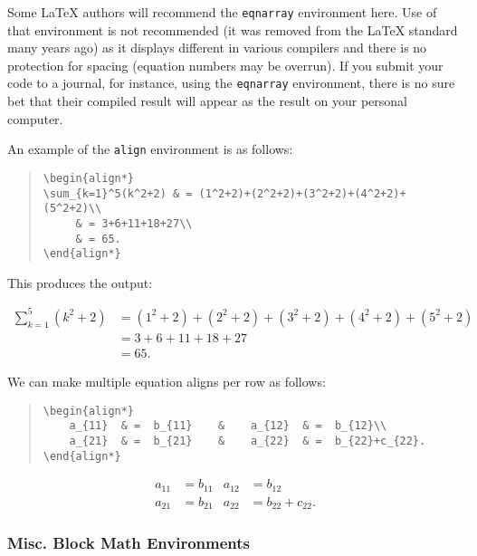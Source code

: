 \documentclass[letterpaper,twoside,10pt]{article}
\begin{document}
Some {\LaTeX} authors will recommend the \verb!eqnarray! environment here. Use of that environment is not recommended (it was removed from the {\LaTeX} standard many years ago) as it displays different in various compilers and there is no protection for spacing (equation numbers may be overrun). If you submit your code to a journal, for instance, using the \verb!eqnarray! environment, there is no sure bet that their compiled result will appear as the result on your personal computer.

\bigbreak An example of the \verb!align! environment is as follows:

\begin{quote}
\begin{verbatim}
\begin{align*}
\sum_{k=1}^5(k^2+2) & = (1^2+2)+(2^2+2)+(3^2+2)+(4^2+2)+(5^2+2)\\
     & = 3+6+11+18+27\\
     & = 65.
\end{align*}
\end{verbatim}
\end{quote}

This produces the output:

\begin{align*}
\sum_{k=1}^5(k^2+2) & = (1^2+2)+(2^2+2)+(3^2+2)+(4^2+2)+(5^2+2)\\
     & = 3+6+11+18+27\\
     & = 65.
\end{align*}



We can make multiple equation aligns per row as follows:

\begin{quote}
\begin{verbatim}
\begin{align*}
    a_{11}  & =  b_{11}    &    a_{12}  & =  b_{12}\\
    a_{21}  & =  b_{21}    &    a_{22}  & =  b_{22}+c_{22}.
\end{align*}
\end{verbatim}
\end{quote}

\begin{align*}
a_{11}	& =b_{11}&
  a_{12}& =b_{12}\\
a_{21}& =b_{21}&
  a_{22}& =b_{22}+c_{22}.
\end{align*}

\newpage
\subsubsection{Misc. Block Math Environments}
\end{document}
